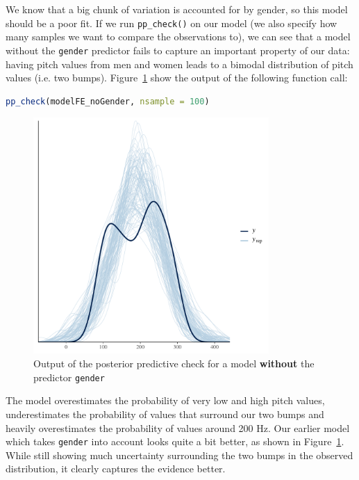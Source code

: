 \documentclass[nobib]{tufte-handout}
\begin{document}
We know that a big chunk of variation is accounted for by gender, so this model should be a
poor fit. If we run \texttt{pp\_check()} on our model (we also specify how many samples we want
to compare the observations to), we can see that a model without the \texttt{gender} predictor
fails to capture an important property of our data: having pitch values from men and women
leads to a bimodal distribution of pitch values (i.e. two bumps).
Figure~\ref{fig:coefficients_table} show the output of the following function call:

\bigskip

\begin{minipage}[]{1\textwidth}
\begin{lstlisting}[language=R]
pp_check(modelFE_noGender, nsample = 100)
\end{lstlisting}
\end{minipage}

\begin{figure}[]
  \centering
    \includegraphics[width = 0.8\textwidth]{pics/pp_check_FE_noGender.pdf}
    \caption{Output of the posterior predictive check for a model \textbf{without} the predictor \texttt{gender}}
    \label{fig:coefficients_table}
\end{figure}


The model overestimates the probability of very low and high pitch values, underestimates the probability of values that surround our two bumps and heavily overestimates the probability of values around 200 Hz.
Our earlier model which takes \texttt{gender} into account looks quite a bit better, as shown
in Figure~\ref{fig:coefficients_table}. While still showing much uncertainty surrounding the two bumps in the observed distribution, it clearly captures the evidence better. 
\end{document}
